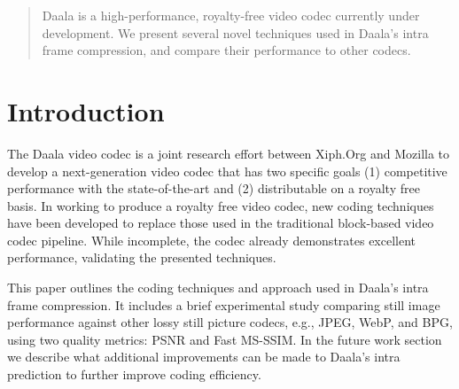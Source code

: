 \documentclass[conference, 10pt]{IEEEtran}
\begin{document}




\maketitle


\begin{abstract}
Daala is a high-performance, royalty-free video codec currently under development.
We present several novel techniques used in Daala's intra frame compression, and compare
their performance to other codecs.
\end{abstract}





%
\IEEEpeerreviewmaketitle



\section{Introduction}
The Daala video codec is a joint research effort between Xiph.Org and Mozilla
 to develop a next-generation video codec that has two specific goals (1)
 competitive performance with the state-of-the-art and (2) distributable on
 a royalty free basis.
In working to produce a royalty free video codec, new coding techniques have
 been developed to replace those used in the traditional block-based video
 codec pipeline.
While incomplete, the codec already demonstrates excellent performance,
 validating the presented techniques.

This paper outlines the coding techniques and approach used in Daala's intra
 frame compression.
It includes a brief experimental study comparing still image performance
 against other lossy still picture codecs, e.g., JPEG, WebP, and BPG, using
 two quality metrics: PSNR and Fast MS-SSIM\cite{Chen2010}.
In the future work section we describe what additional improvements can be made
 to Daala's intra prediction to further improve coding efficiency.
\end{document}
